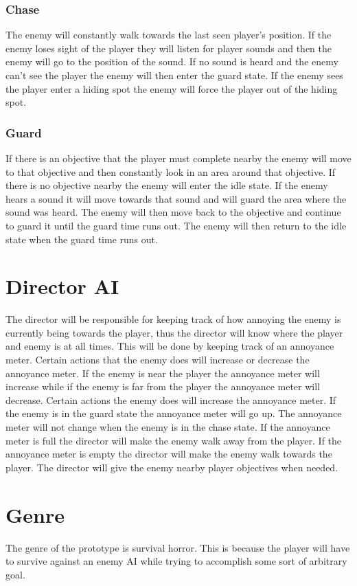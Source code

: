 \documentclass{article}
\begin{document}
\subsubsection*{Chase}
The enemy will constantly walk towards the last seen player's position. If the enemy
loses sight of the player they will listen for player sounds and then the
enemy will go to the position of the sound.
If no sound is heard and the enemy can't see the player the enemy will then
enter the guard state. 
If the enemy sees the player enter a hiding spot the enemy will force the player out of the hiding spot.

\subsubsection*{Guard}
If there is an objective that the player must complete nearby the enemy will
move to that objective and then constantly look in an area around that objective.
If there is no objective nearby the enemy will enter the idle state.
If the enemy hears a sound it will move towards that sound and will guard the
area where the sound was heard. The enemy will then move back to the objective
and continue to guard it until the guard time runs out. The enemy will then return
to the idle state when the guard time runs out.

\section*{Director AI}
The director will be responsible for keeping track of how annoying the enemy
is currently being towards the player, thus the director will know where the
player and enemy is at all times.
This will be done by keeping track of an annoyance meter. 
Certain actions that the enemy does will increase or decrease the annoyance meter.
If the enemy is near the player the annoyance meter will increase while if the enemy
is far from the player the annoyance meter will decrease.
Certain actions the enemy does will increase the annoyance meter. If the enemy is
in the guard state the annoyance meter will go up.
The annoyance meter will not change when the enemy is in the chase state.
If the annoyance meter is full the director will make the enemy walk away from the
player.
If the annoyance meter is empty the director will make the enemy walk towards the
player.
The director will give the enemy nearby player objectives when needed.


\section*{Genre}
The genre of the prototype is survival horror. This is because the player will have to
survive against an enemy AI while trying to accomplish some sort of arbitrary goal.
\end{document}
